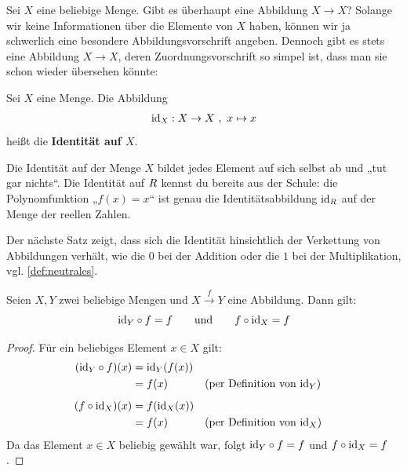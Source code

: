 Sei $X$ eine beliebige Menge. Gibt es überhaupt eine Abbildung $X\to X$? Solange wir keine Informationen über die Elemente von $X$ haben, können wir ja schwerlich eine besondere Abbildungsvorschrift angeben. Dennoch gibt es stets eine Abbildung $X\to X$, deren Zuordnungsvorschrift so simpel ist, dass man sie schon wieder übersehen könnte:


\begin{defin}[Identitätsabbildung] 
    Sei $X$ eine Menge. Die Abbildung
    \begin{align*}
        \mathrm{id}_X: X \to X \ ,\ x \mapsto x
    \end{align*}
    heißt die \textbf{Identität auf $X$}.
\end{defin}


\begin{bem}
    Die Identität auf der Menge $X$ bildet jedes Element auf sich selbst ab und „tut gar nichts“. Die Identität auf $\relax R$ kennst du bereits aus der Schule: die Polynomfunktion „$f(x)=x$“ ist genau die Identitätsabbildung $\mathrm{id}_\relax R$ auf der Menge der reellen Zahlen.
\end{bem}


Der nächste Satz zeigt, dass sich die Identität hinsichtlich der Verkettung von Abbildungen verhält, wie die $0$ bei der Addition oder die $1$ bei der Multiplikation, vgl. \cref{def:neutrales}.


\begin{satz} \label{idneutral}
    Seien $X,Y$ zwei beliebige Mengen und $X\xrightarrow{f} Y$ eine Abbildung. Dann gilt:
        \[ \mathrm{id}_Y \circ f = f \qquad\textnormal{und}\qquad f\circ \mathrm{id}_X = f \]
\end{satz}
\begin{proof}
    Für ein beliebiges Element $x \in X$ gilt:
    \begin{align*}
        (\mathrm{id}_Y \circ f)(x) & =\mathrm{id}_Y(f(x)) \\
        & = f(x)&& (\text{per Definition von $\mathrm{id}_Y$}) \\[0.5em]
        (f\circ \mathrm{id}_X)(x) & = f(\mathrm{id}_X(x)) \\
        & =f(x) && (\text{per Definition von $\mathrm{id}_X$})
    \end{align*}
    Da das Element $x\in X$ beliebig gewählt war, folgt $\mathrm{id}_Y\circ f=f$ und $f\circ \mathrm{id}_X=f$.
\end{proof}


